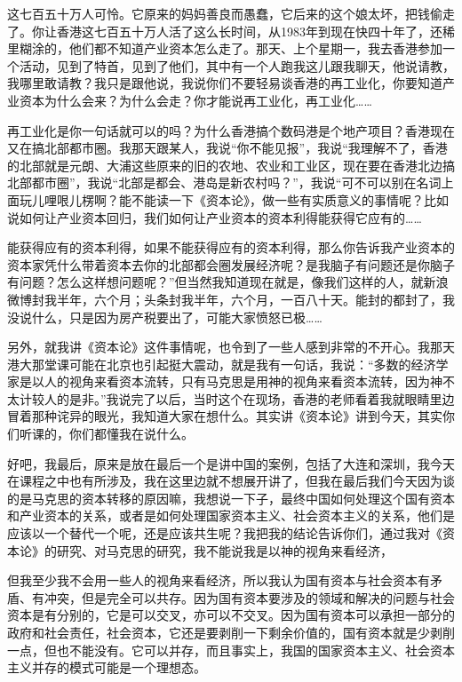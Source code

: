 \documentclass[UTF8, 12pt, a4paper]{ctexrep}
\begin{document}
这七百五十万人可怜。它原来的妈妈善良而愚蠢，它后来的这个娘太坏，把钱偷走了。你让香港这七百五十万人活了这么长时间，从1983年到现在快四十年了，还稀里糊涂的，他们都不知道产业资本怎么走了。那天、上个星期一，我去香港参加一个活动，见到了特首，见到了他们，其中有一个人跑我这儿跟我聊天，他说请教，我哪里敢请教？我只是跟他说，我说你们不要轻易谈香港的再工业化，你要知道产业资本为什么会来？为什么会走？你才能说再工业化，再工业化……

再工业化是你一句话就可以的吗？为什么香港搞个数码港是个地产项目？香港现在又在搞北部都市圈。我那天跟某人，我说“你不能见报”，我说“我理解不了，香港的北部就是元朗、大浦这些原来的旧的农地、农业和工业区，现在要在香港北边搞北部都市圈”，我说“北部是都会、港岛是新农村吗？”，我说“可不可以别在名词上面玩儿哩哏儿楞啊？能不能读一下《资本论》，做一些有实质意义的事情呢？比如说如何让产业资本回归，我们如何让产业资本的资本利得能获得它应有的……

能获得应有的资本利得，如果不能获得应有的资本利得，那么你告诉我产业资本的资本家凭什么带着资本去你的北部都会圈发展经济呢？是我脑子有问题还是你脑子有问题？怎么这样想问题呢？”但当然我知道现在就是，像我们这样的人，就新浪微博封我半年，六个月；头条封我半年，六个月，一百八十天。能封的都封了，我没说什么，只是因为房产税要出了，可能大家愤怒已极……

另外，就我讲《资本论》这件事情呢，也令到了一些人感到非常的不开心。我那天港大那堂课可能在北京也引起挺大震动，就是我有一句话，我说：“多数的经济学家是以人的视角来看资本流转，只有马克思是用神的视角来看资本流转，因为神不太计较人的是非。”我说完了以后，当时这个在现场，香港的老师看着我就眼睛里边冒着那种诧异的眼光，我知道大家在想什么。其实讲《资本论》讲到今天，其实你们听课的，你们都懂我在说什么。

好吧，我最后，原来是放在最后一个是讲中国的案例，包括了大连和深圳，我今天在课程之中也有所涉及，我在这里边就不想展开讲了，但我在最后我们今天因为谈的是马克思的资本转移的原因嘛，我想说一下子，最终中国如何处理这个国有资本和产业资本的关系，或者是如何处理国家资本主义、社会资本主义的关系，他们是应该以一个替代一个呢，还是应该共生呢？我把我的结论告诉你们，通过我对《资本论》的研究、对马克思的研究，我不能说我是以神的视角来看经济，

但我至少我不会用一些人的视角来看经济，所以我认为国有资本与社会资本有矛盾、有冲突，但是完全可以共存。因为国有资本要涉及的领域和解决的问题与社会资本是有分别的，它是可以交叉，亦可以不交叉。因为国有资本可以承担一部分的政府和社会责任，社会资本，它还是要剥削一下剩余价值的，国有资本就是少剥削一点，但也不能没有。它可以并存，而且事实上，我国的国家资本主义、社会资本主义并存的模式可能是一个理想态。
\end{document}
